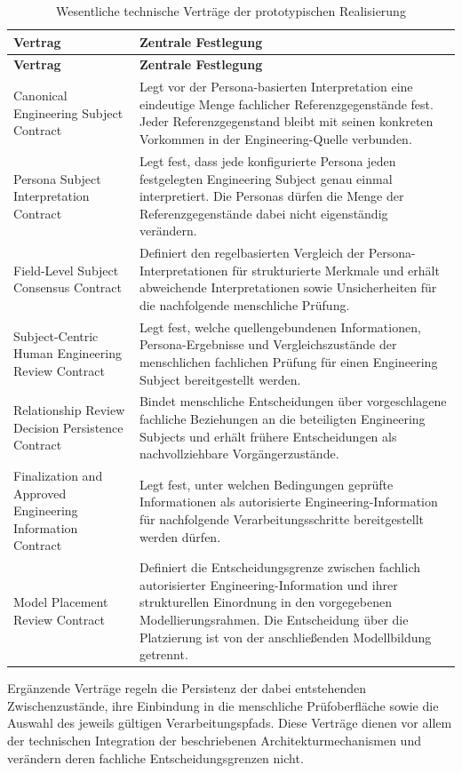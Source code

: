 \begin{longtable}{p{4.5cm}p{8.5cm}}
\caption{Wesentliche technische Verträge der prototypischen Realisierung}
\label{tab:implementation_contracts}\\
\hline
\textbf{Vertrag} & \textbf{Zentrale Festlegung} \\
\hline
\endfirsthead

\hline
\textbf{Vertrag} & \textbf{Zentrale Festlegung} \\
\hline
\endhead

Canonical Engineering Subject Contract &
Legt vor der Persona-basierten Interpretation eine eindeutige Menge
fachlicher Referenzgegenstände fest. Jeder Referenzgegenstand bleibt mit
seinen konkreten Vorkommen in der Engineering-Quelle verbunden. \\

Persona Subject Interpretation Contract &
Legt fest, dass jede konfigurierte Persona jeden festgelegten
Engineering Subject genau einmal interpretiert. Die Personas dürfen die
Menge der Referenzgegenstände dabei nicht eigenständig verändern. \\

Field-Level Subject Consensus Contract &
Definiert den regelbasierten Vergleich der Persona-Interpretationen für
strukturierte Merkmale und erhält abweichende Interpretationen sowie
Unsicherheiten für die nachfolgende menschliche Prüfung. \\

Subject-Centric Human Engineering Review Contract &
Legt fest, welche quellengebundenen Informationen, Persona-Ergebnisse und
Vergleichszustände der menschlichen fachlichen Prüfung für einen
Engineering Subject bereitgestellt werden. \\

Relationship Review Decision Persistence Contract &
Bindet menschliche Entscheidungen über vorgeschlagene fachliche Beziehungen
an die beteiligten Engineering Subjects und erhält frühere Entscheidungen
als nachvollziehbare Vorgängerzustände. \\

Finalization and Approved Engineering Information Contract &
Legt fest, unter welchen Bedingungen geprüfte Informationen als
autorisierte Engineering-Information für nachfolgende
Verarbeitungsschritte bereitgestellt werden dürfen. \\

Model Placement Review Contract &
Definiert die Entscheidungsgrenze zwischen fachlich autorisierter
Engineering-Information und ihrer strukturellen Einordnung in den
vorgegebenen Modellierungsrahmen. Die Entscheidung über die Platzierung ist
von der anschließenden Modellbildung getrennt. \\

\hline
\end{longtable}

Ergänzende Verträge regeln die Persistenz der dabei entstehenden
Zwischenzustände, ihre Einbindung in die menschliche Prüfoberfläche sowie
die Auswahl des jeweils gültigen Verarbeitungspfads. Diese Verträge dienen
vor allem der technischen Integration der beschriebenen
Architekturmechanismen und verändern deren fachliche Entscheidungsgrenzen
nicht.